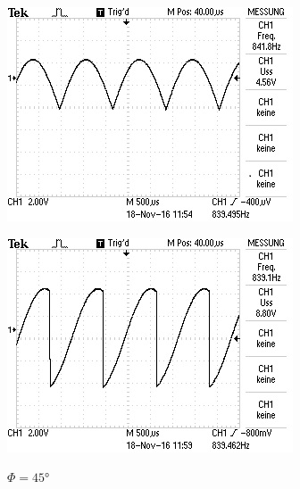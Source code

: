 \begin{figure}[!h]
\begin{minipage}[t]{0.3\textwidth}
    \label{fig:45}
    \caption{$\Phi=45\si{\degree}$}
  \end{minipage}
  \hspace{12pt}
  \vspace{5pt}
  \begin{minipage}[t]{0.3\textwidth}
    \includegraphics[width=\textwidth]{Bilder/105.jpeg}
    \label{fig:105}
    \caption{$\Phi=15\si{\degree}$}
  \end{minipage}
  \hspace{12pt}
  \vspace{5pt}
  \begin{minipage}[t]{0.3\textwidth}
    \includegraphics[width=\textwidth]{Bilder/165.jpeg}
    \label{fig:165}
    \caption{$\Phi=45\si{\degree}$}

\end{minipage}
\end{figure}

